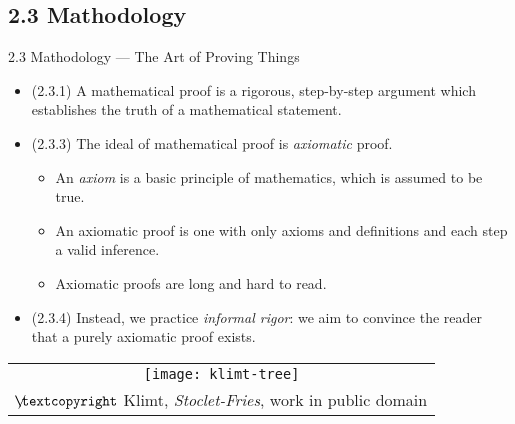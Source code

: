 \documentclass[../slides.tex]{subfiles}
\begin{document}
\subsection{2.3 Mathodology}

\begin{frame}{2.3 Mathodology --- The Art of Proving Things}

	\begin{itemize}
	
		\item (2.3.1) A mathematical proof is a rigorous, step-by-step argument which establishes the truth of a mathematical statement.
	
		\item (2.3.3) The ideal of mathematical proof is \emph{axiomatic} proof.
		
		\begin{itemize}
		
			\item An \emph{axiom} is a basic principle of mathematics, which is assumed to be true.
			
			\item An axiomatic proof is one with only axioms and definitions and each step a valid inference.
			
			\item Axiomatic proofs are long and hard to read.
		
		\end{itemize}
		
		\item (2.3.4) Instead, we practice \emph{informal rigor}: we aim to convince the reader that a purely axiomatic proof exists.
	
	\end{itemize}
	
	
	\begin{center}
		\begin{tabular}{c}
		\texttt{[image: klimt-tree]}\\[-1ex]
		{\tiny $\not\hspace{-1ex}\textcopyright$ Klimt, \emph{Stoclet-Fries}, work in public domain}
		\end{tabular}
		\end{center}


\end{frame}
\end{document}
